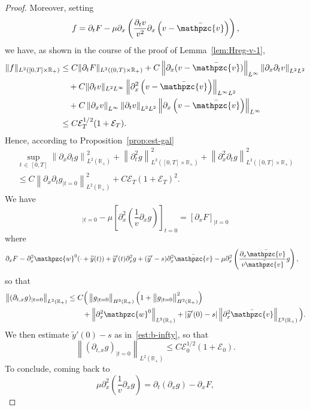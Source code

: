 \documentclass[AHL,Unicode,longabstracts,published]{cedram}
\newcommand{\R}{\mathbb{R}}
\newcommand{\p}{\partial}
\newcommand{\bv}{\bar{\mathpzc{v}}}
\newcommand{\cE}{\mathcal E}
\newcommand{\tw}{\mathpzc{w}}
\newcommand{\ty}{\widetilde{y}}
\begin{document}
\begin{proof}
Moreover, setting
\[
f = \partial_t F- \mu \p_x \left(\frac{\p_t v}{v^2}\p_x \left(v-\bv\right)\right),
\]
we have, as shown in the course of the proof of Lemma~\ref{lem:Hreg-v-1},
\begin{align*}
\|f\|_{L^2([0,T] \times \R_+)} &\leq C \|\p_t F \|_{L^2((0,T)\times \R_+)}+ C \left\|\p_x (v-\bv)\right\|_{L^\infty} \left\|\p_x \p_t v\right\|_{L^2 L^2} \\
&\quad +C \|\p_t v\|_{L^2 L^\infty}\left\|\p_x^2\left(v-\bv\right)\right\|_{L^\infty L^2} \\
&\quad + C \left\|\p_x v\right\|_{L^\infty} \left\|\p_t v \right\|_{L^2 L^2}\left\|\p_x \left(v-\bv\right)\right\|_{L^\infty }\\
& \leq C \cE_T^{1/2} (1+ \cE_T).
\end{align*}
Hence, according to Proposition~\ref{prop:est-gal}
\begin{multline*}
\sup_{t\,\in\,[0,T]} \left\|\partial_x \partial_t g\right\|_{L^2(\R_+)}^2 + \left\|\partial^2_tg\right\|_{L^2([0,T] \times \R_+)}^2 + \left\|\partial^2_x \partial_t g\right\|_{L^2([0,T] \times \R_+)}^2 \\
 \leq C
\left\|\partial_x \partial_t g_{|t=0}\right\|_{L^2(\R_+)}^2 + C \cE_T (1+ \cE_T)^2.
\end{multline*}
We have
\begin{equation*}
[\partial_t \partial_xg]_{|t=0} - \mu \left[\partial^2_x\left(\dfrac{1}{v}\partial_xg\right)\right]_{t=0} = [\partial_x F]_{|t=0}
\end{equation*}
where
\begin{align*}
\partial_x F & = \partial^2_x \tw^0(\cdot + \ty(t)) + \ty'(t) \partial^2_x g + (\ty'-s)\partial^2_x \bv - \mu \partial^2_x\left(\dfrac{\partial_x \bv}{v \bv}g \right),
\end{align*}
so that
\begin{align*}
\left\|(\partial_{t,x}g)_{|t=0}\right\|_{L^2(\R_+)} &\leq C \Big(\left\|g_{|t=0}\right\|_{H^3(\R_+)} \left(1 + \left\| g_{|t=0}\right\|_{H^2(\R_+)}^2\right)\\
&\qquad + \left\|\partial^2_x \tw^0\right\|_{L^2(\R_+)} + |\ty'(0)-s| \left\|\partial^2_x \bv\right\|_{L^2(\R_+)}
\Big).
\end{align*}
We then estimate $\ty'(0)-s$ as in~\eqref{est:b-infty}, so that 
\[
\left\|(\partial_{t,x}g)_{|t=0}\right\|_{L^2(\R_+)}\leq C \cE_0^{1/2} (1+ \cE_0).
\]
To conclude, coming back to
\begin{equation*}
\mu \partial^2_x\left(\dfrac{1}{v} \partial_{x}g \right) = \partial_t (\partial_{x}g) - \partial_{x} F,

\end{equation*}
\end{proof}
\end{document}
